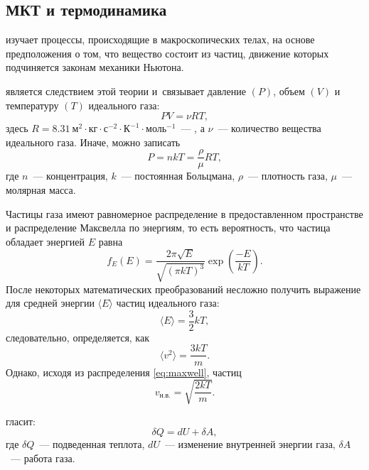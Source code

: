 \subsection{МКТ и термодинамика}
\label{sec:mkt}
 изучает процессы, происходящие в макроскопических телах, на основе предположения о том, что вещество состоит из частиц, движение которых подчиняется законам механики Ньютона.

 является следствием этой теории и~связывает давление $(P)$, объем $(V)$ и температуру $(T)$ идеального газа:
\begin{equation}
    PV = \nu R T,
    \label{eq:mkt-idial-gas}
\end{equation}
здесь $R = 8.31~\text{м}^2 \cdot \text{кг} \cdot \text{с}^{-2} \cdot \text{К}^{-1} \cdot \text{моль}^{-1}$~--- , а $\nu$~--- количество вещества идеального газа. Иначе, можно записать
\begin{equation}
    P = nkT =  \frac{\rho}{\mu}RT,
    \label{eq:mkt-p}
\end{equation}
где $n$~--- концентрация, $k$~--- постоянная Больцмана, $\rho$~--- плотность газа, $\mu$~--- молярная масса.

Частицы газа имеют равномерное распределение в предоставленном пространстве и распределение Максвелла по энергиям, то есть вероятность, что частица обладает энергией $E$ равна
\begin{equation}
    f_E(E) = \frac {2\pi \sqrt{E}}{\sqrt{(\pi kT)^3}}  \exp\left(\frac {-E} {kT} \right).
    \label{eq:maxwell}
\end{equation}
После некоторых математических преобразований несложно получить выражение для средней энергии $\langle E \rangle$ частиц идеального газа:
\begin{equation}
    \langle E \rangle = \frac{3}{2}kT,
\end{equation}
следовательно,  определяется, как
\begin{equation}
    \langle v^2 \rangle = \frac{3kT}{m}.
\end{equation}
Однако, исходя из распределения \eqref{eq:maxwell},  частиц
\begin{equation}
    v_\text{н.в.} = \sqrt{\frac{2kT}{m}}.
\end{equation}

 гласит:
\begin{equation}
    \delta Q = dU + \delta A,
\end{equation}
где $\delta Q$~--- подведенная теплота, $d U$~--- изменение внутренней энергии газа, $\delta A$~--- работа газа.

